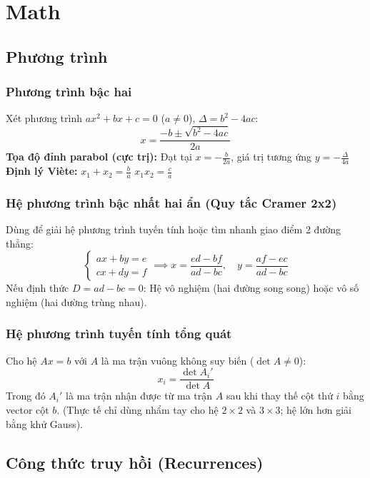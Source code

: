 \chapter{Math}

\section{Phương trình}

\subsection{Phương trình bậc hai}
Xét phương trình $ax^2 + bx + c = 0$ ($a \neq 0$), $\Delta = b^2 - 4ac$:
\[ x = \frac{-b \pm \sqrt{b^2 - 4ac}}{2a} \]
\textbf{Tọa độ đỉnh parabol (cực trị):} Đạt tại $x = -\frac{b}{2a}$, giá trị tương ứng $y = -\frac{\Delta}{4a}$ \\
\textbf{Định lý Viète:} \quad $x_1 + x_2 = \frac{b}{a}$ \quad $x_1 x_2 = \frac{c}{a}$ \\

\subsection{Hệ phương trình bậc nhất hai ẩn (Quy tắc Cramer 2x2)}
Dùng để giải hệ phương trình tuyến tính hoặc tìm nhanh giao điểm 2 đường thẳng:
\[ \begin{cases} ax + by = e \\ cx + dy = f \end{cases} \implies
x = \frac{ed - bf}{ad - bc}, \quad y = \frac{af - ec}{ad - bc} \]
Nếu định thức $D = ad - bc = 0$: Hệ vô nghiệm (hai đường song song) hoặc vô số nghiệm (hai đường trùng nhau).

\subsection{Hệ phương trình tuyến tính tổng quát}
Cho hệ $Ax = b$ với $A$ là ma trận vuông không suy biến ($\det A \neq 0$):
\[ x_i = \frac{\det A_i'}{\det A} \]
Trong đó $A_i'$ là ma trận nhận được từ ma trận $A$ sau khi thay thế cột thứ $i$ bằng vector cột $b$. (Thực tế chỉ dùng nhẩm tay cho hệ $2 \times 2$ và $3 \times 3$; hệ lớn hơn giải bằng khử Gauss).

\section{Công thức truy hồi (Recurrences)}

